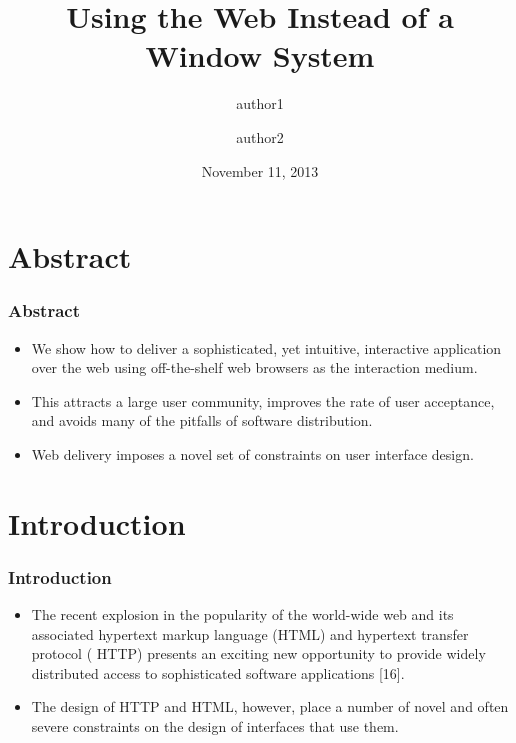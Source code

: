 \documentclass{beamer}
\begin{document}
\title{Using the Web Instead of a Window System}

\author[author1 and author2]{author1
\and
author2}


\date{November 11, 2013}





\begin{frame}
\titlepage
\end{frame}

\section[Abstract]{Abstract}


\begin{frame}
\frametitle{Abstract}

\begin{itemize}
\item We show how to deliver a sophisticated, yet intuitive, interactive application over the web using off-the-shelf web browsers as the interaction medium.
\item This attracts a large user community, improves the rate of user acceptance, and avoids many of the pitfalls of software distribution.
\item Web delivery imposes a novel set of constraints on user interface design.
\end{itemize}

\end{frame}

\section[Introduction]{Introduction}


\begin{frame}
\frametitle{Introduction}

\begin{itemize}
\item The recent explosion in the popularity of the world-wide web and its associated hypertext markup language (HTML) and hypertext transfer protocol ( HTTP) presents an exciting new opportunity to provide widely distributed access to sophisticated software applications [16].
\item The design of HTTP and HTML, however, place a number of novel and often severe constraints on the design of interfaces that use them.
\end{itemize}

\end{frame}
\end{document}
